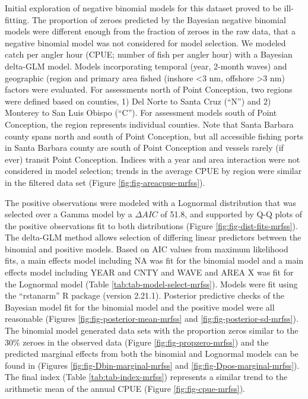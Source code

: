 \documentclass[11pt,
  english,
]{article}
\begin{document}
Initial exploration of negative binomial models for this dataset proved to be ill-fitting. The proportion of zeroes predicted by the Bayesian negative binomial models were different enough from the fraction of zeroes in the raw data, that a negative binomial model was not considered for model selection. We modeled catch per angler hour (CPUE; number of fish per angler hour) with a Bayesian delta-GLM model. Models incorporating temporal (year, 2-month waves) and geographic (region and primary area fished (inshore \textless3 nm, offshore \textgreater3 nm) factors were evaluated. For assessments north of Point Conception, two regions were defined based on counties, 1) Del Norte to Santa Cruz (``N'') and 2) Monterey to San Luis Obispo (``C''). For assessment models south of Point Conception, the region represents individual counties. Note that Santa Barbara county spans north and south of Point Conception, but all accessible fishing ports in Santa Barbara county are south of Point Conception and vessels rarely (if ever) transit Point Conception. Indices with a year and area interaction were not considered in model selection; trends in the average CPUE by region were similar in the filtered data set (Figure \ref{fig:fig-areacpue-mrfss}).

The positive observations were modeled with a Lognormal distribution that was selected over a Gamma model by a {\(\Delta AIC\)\leavevmode\tagmcend\tagstructend} of 51.8, and supported by Q-Q plots of the positive observations fit to both distributions (Figure \ref{fig:fig-dist-fits-mrfss}). The delta-GLM method allows selection of differing linear predictors between the binomial and positive models. Based on AIC values from maximum likelihood fits, a main effects model including NA was fit for the binomial model and a main effects model including YEAR and CNTY and WAVE and AREA X was fit for the Lognormal model (Table \ref{tab:tab-model-select-mrfss}). Models were fit using the ``rstanarm'' R package (version 2.21.1). Posterior predictive checks of the Bayesian model fit for the binomial model and the positive model were all reasonable (Figures \ref{fig:fig-posterior-mean-mrfss} and \ref{fig:fig-posterior-sd-mrfss}). The binomial model generated data sets with the proportion zeros similar to the 30\% zeroes in the observed data (Figure \ref{fig:fig-propzero-mrfss}) and the predicted marginal effects from both the binomial and Lognormal models can be found in (Figures \ref{fig:fig-Dbin-marginal-mrfss} and \ref{fig:fig-Dpos-marginal-mrfss}). The final index (Table \ref{tab:tab-index-mrfss}) represents a similar trend to the arithmetic mean of the annual CPUE (Figure \ref{fig:fig-cpue-mrfss}).
\end{document}
